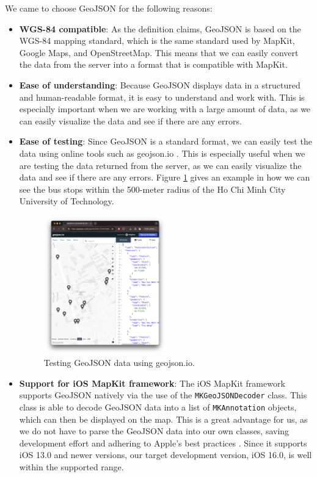We came to choose GeoJSON for the following reasons:

\begin{itemize}
    \item \textbf{WGS-84 compatible}: As the definition claims, GeoJSON is based on the WGS-84 mapping standard, which is the same standard used by MapKit, Google Maps, and OpenStreetMap. This means that we can easily convert the data from the server into a format that is compatible with MapKit.
    \item \textbf{Ease of understanding}: Because GeoJSON displays data in a structured and human-readable format, it is easy to understand and work with. This is especially important when we are working with a large amount of data, as we can easily visualize the data and see if there are any errors.
    \item \textbf{Ease of testing}: Since GeoJSON is a standard format, we can easily test the data using online tools such as geojson.io \cite{mapbox_geojsonio}. This is especially useful when we are testing the data returned from the server, as we can easily visualize the data and see if there are any errors. Figure \ref{fig:geojson_io} gives an example in how we can see the bus stops within the 500-meter radius of the Ho Chi Minh City University of Technology.
    \begin{figure}[H]
        \centering
        \includegraphics[width=0.5\textwidth]{assets/images/Research/geojson/geojsonio.png}
        \caption{Testing GeoJSON data using geojson.io.}
        \label{fig:geojson_io}
    \end{figure}
    \item \textbf{Support for iOS MapKit framework}: The iOS MapKit framework supports GeoJSON natively via the use of the \lstinline{MKGeoJSONDecoder} class. This class is able to decode GeoJSON data into a list of \lstinline{MKAnnotation} objects, which can then be displayed on the map. This is a great advantage for us, as we do not have to parse the GeoJSON data into our own classes, saving development effort and adhering to Apple's best practices \cite{mkgeojsonobject}. Since it supports iOS 13.0 and newer versions, our target development version, iOS 16.0, is well within the supported range.
\end{itemize}

